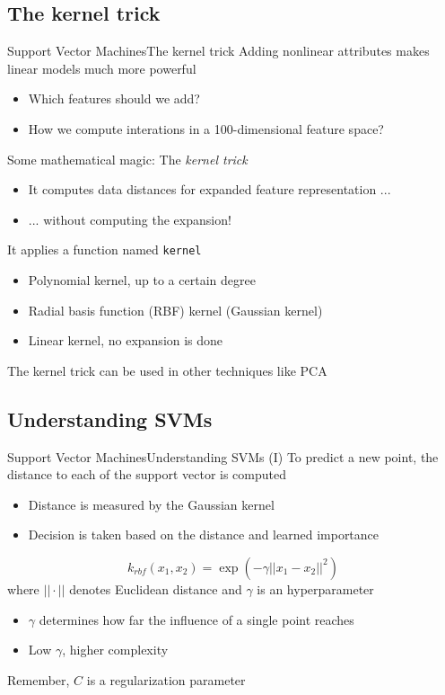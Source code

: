 \documentclass[10pt,compress]{beamer} %
\begin{document}
\subsection{The kernel trick}
\begin{frame}{Support Vector Machines}{The kernel trick}
    Adding nonlinear attributes makes linear models much more powerful
    \begin{itemize}
        \item Which features should we add?
        \item How we compute interations in a 100-dimensional feature space?
    \end{itemize}

    Some mathematical magic: The \textit{kernel trick}
    \begin{itemize}
        \item It computes data distances for expanded feature representation ...
        \item ... without computing the expansion!
    \end{itemize}

    It applies a function named \texttt{kernel}
    \begin{itemize}
        \item Polynomial kernel, up to a certain degree
        \item Radial basis function (RBF) kernel (Gaussian kernel)
        \item Linear kernel, no expansion is done
    \end{itemize}
    The kernel trick can be used in other techniques like PCA
\end{frame}

\subsection{Understanding SVMs}
\begin{frame}{Support Vector Machines}{Understanding SVMs (I)}
    To predict a new point, the distance to each of the support vector is computed
    \begin{itemize}
        \item Distance is measured by the Gaussian kernel
        \item Decision is taken based on the distance and learned importance
    \end{itemize}
    \begin{equation*}
        k_{rbf}(x_1, x_2) = \exp (- \gamma || x_1 - x_2 ||^2)
    \end{equation*}
    where $|| \cdot ||$ denotes Euclidean distance and $\gamma$ is an hyperparameter
    \begin{itemize}
        \item $\gamma$ determines how far the influence of a single point reaches
        \item Low $\gamma$, higher complexity
    \end{itemize}
    Remember, $C$ is a regularization parameter
\end{frame}
\end{document}
